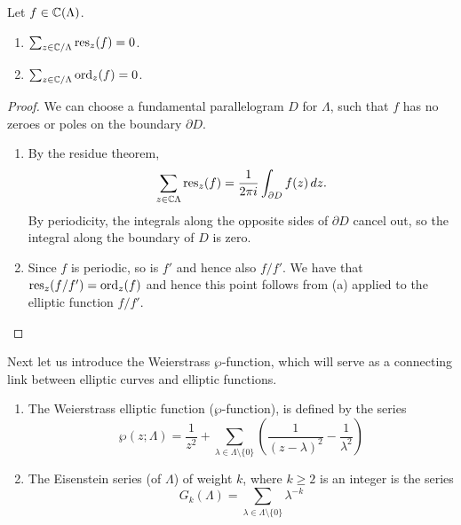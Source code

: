 \begin{proposition}
	\label{prop:residue}
	Let $f \in \mathbb{C}(\Lambda)$.
	\begin{enumerate}[label=(\alph*)]
		\item $\sum_{z \in \mathbb{C}/\Lambda} \operatorname{res}_z(f) = 0$.
		\item $\sum_{z \in \mathbb{C}/\Lambda} \operatorname{ord}_z(f) = 0$.
	\end{enumerate}
\end{proposition}

\begin{proof}
	We can choose a fundamental parallelogram $D$ for $\Lambda$,
	such that $f$ has no zeroes or poles on the boundary $\partial D$.
	\begin{enumerate}[label=(\alph*)]
		\item By the residue theorem,
			\begin{equation*}
				\sum_{z \in \mathbb{C}\Lambda} \operatorname{res}_z(f)
				= \frac{1}{2\pi i}\int_{\partial D}f(z)\,dz.
			\end{equation*}
			By periodicity, the integrals along the opposite sides of $\partial D$
			cancel out, so the integral along the boundary of $D$ is zero.
		\item Since $f$ is periodic, so is $f'$ and hence also
			$f/f'$. We have that $\operatorname{res}_z(f/f') = \operatorname{ord}_z(f)$ and hence 
			this point follows from (a) applied to the elliptic function
			$f/f'$.
	\end{enumerate}
\end{proof}

Next let us introduce the Weierstrass $\wp$-function, which will serve
as a connecting link between elliptic curves and elliptic functions.

\begin{definition}
	\begin{enumerate}[label=(\alph*)]
		\item
			The Weierstrass
			elliptic function ($\wp$-function),
			is defined by the series
			\begin{equation*}
				\wp(z; \Lambda) = \frac{1}{z^2}
				+ \sum_{\lambda \in \Lambda\setminus\{0\}}
				\left(
					\frac{1}{(z-\lambda)^2} - \frac{1}{\lambda^2}
				\right)
			\end{equation*}
		\item
			The Eisenstein series (of $\Lambda$) of weight $k$,
			where $k \geq 2$ is an integer
			is the series
			\begin{equation*}
				G_k(\Lambda) = \sum_{\lambda \in \Lambda\setminus\{0\}}
				\lambda^{-k}
			\end{equation*}
	\end{enumerate}
\end{definition}

